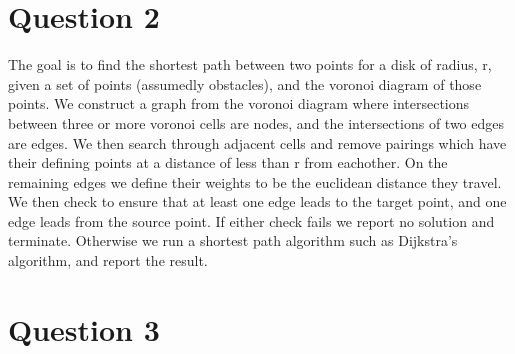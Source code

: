 \documentclass{article}
\begin{document}
\section{Question 2}
The goal is to find the shortest path between two points for a disk of radius, r, given a 
set of points (assumedly obstacles), and the voronoi diagram of those points.
We construct a graph from the voronoi diagram where intersections between three or more voronoi cells are nodes,
and the intersections of two edges are edges. 
We then search through adjacent cells and remove pairings which have their defining points at a
distance of less than r from eachother. 
On the remaining edges we define their weights to be the euclidean distance they travel. 
We then check to ensure that at least one edge leads to the target point, and one
edge leads from the source point. 
If either check fails we report no solution and terminate.
Otherwise we run a shortest path algorithm such as Dijkstra's algorithm, and report
the result. 

\section{Question 3}
\end{document}
